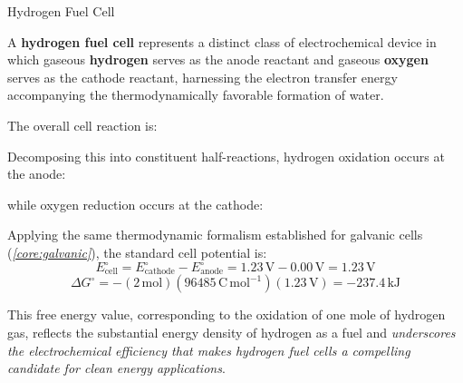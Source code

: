 \documentclass[10pt]{article}
\begin{document}
    \begin{core}{Hydrogen Fuel Cell}

      A \textbf{hydrogen fuel cell} represents a distinct class of electrochemical device in which gaseous \textbf{hydrogen} serves as the anode reactant and gaseous \textbf{oxygen} serves as the cathode reactant, harnessing the electron transfer energy accompanying the thermodynamically favorable formation of water.


      The overall cell reaction is:


      Decomposing this into constituent half-reactions, hydrogen oxidation occurs at the anode:


      while oxygen reduction occurs at the cathode:


      Applying the same thermodynamic formalism established for galvanic cells (\textit{\autoref{core:galvanic}}), the standard cell potential is:
      \[
        E^{\circ}_{\text{cell}} = E^{\circ}_{\text{cathode}} - E^{\circ}_{\text{anode}} = 1.23\,\text{V} - 0.00\,\text{V} = 1.23\,\text{V}
      \]
      \[
        \Delta G^{\circ} = -(2\,\text{mol})(96485\,\text{C}\,\text{mol}^{-1})(1.23\,\text{V}) = -237.4\,\text{kJ}
      \]

      This free energy value, corresponding to the oxidation of one mole of hydrogen gas, reflects the substantial energy density of hydrogen as a fuel and \textit{underscores the electrochemical efficiency that makes hydrogen fuel cells a compelling candidate for clean energy applications}.

    \end{core}
\end{document}
